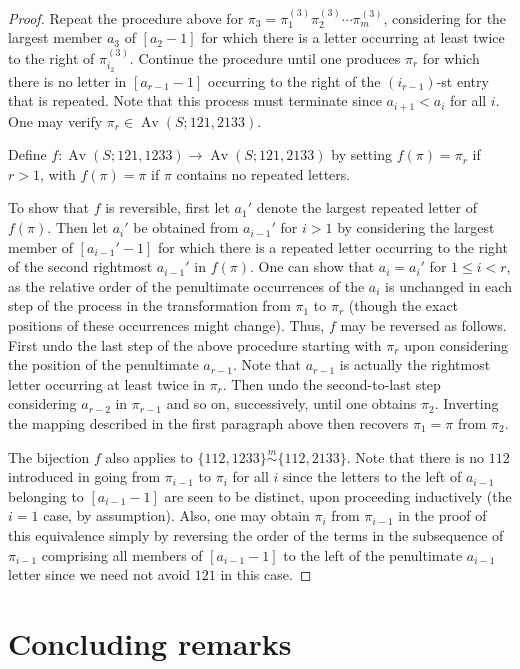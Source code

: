 \documentclass[11pt]{amsart}
\theoremstyle{plain}
\theoremstyle{definition}
\newcommand{\csim}{\stackrel{m}{\sim}}
\DeclareMathOperator{\Av}{Av}
\begin{document}
\begin{proof}
Repeat the procedure above for $\pi_3=\pi_1^{(3)}\pi_2^{(3)}\cdots\pi_m^{(3)}$, considering for the
largest member $a_3$ of $[a_2-1]$ for which there is a letter occurring at least twice to the right
of $\pi_{i_2}^{(3)}$.  Continue the procedure until one produces $\pi_r$ for which there is no letter
in $[a_{r-1}-1]$ occurring to the right of the $(i_{r-1})$-st entry that is repeated.  Note that this
process must terminate since $a_{i+1}<a_i$ for all $i$.  One may verify $\pi_r \in \Av(S;121,2133)$.

Define $f\colon\Av(S;121,1233)\rightarrow \Av(S;121,2133)$ by setting $f(\pi)=\pi_r$ if $r>1$,
with $f(\pi)=\pi$ if $\pi$ contains no repeated letters.

To show that $f$ is reversible, first let $a_1'$ denote the largest repeated letter of $f(\pi)$.
Then let $a_i'$ be obtained from $a_{i-1}'$ for $i>1$ by considering the largest member of
$[a_{i-1}'-1]$ for which there is a repeated letter occurring to the right of the second rightmost
$a_{i-1}'$ in $f(\pi)$.  One can show that $a_i=a_i'$ for $1 \leq i <r$, as the relative order of the
penultimate occurrences of the $a_i$ is unchanged in each step of the process in the transformation
from $\pi_1$ to $\pi_r$ (though the exact positions of these occurrences might change).  Thus, $f$
may be reversed as follows.  First undo the last step of the above procedure starting with $\pi_r$
upon considering the position of the penultimate $a_{r-1}$.  Note that $a_{r-1}$ is actually the
rightmost letter occurring at least twice in $\pi_r$.  Then undo the second-to-last step considering
$a_{r-2}$ in $\pi_{r-1}$ and so on, successively, until one obtains $\pi_2$.  Inverting the mapping
described in the first paragraph above then recovers $\pi_1=\pi$ from $\pi_2$.

The bijection $f$ also applies to $\{112,1233\}\csim\{112,2133\}$.  Note that there is no $112$
introduced in going from $\pi_{i-1}$ to $\pi_i$ for all $i$ since the letters to the left of
$a_{i-1}$ belonging to $[a_{i-1}-1]$ are seen to be distinct, upon proceeding inductively (the $i=1$
case, by assumption).  Also, one may obtain $\pi_i$ from $\pi_{i-1}$ in the proof of this equivalence
simply by reversing the order of the terms in the subsequence of $\pi_{i-1}$ comprising all members
of $[a_{i-1}-1]$ to the left of the penultimate $a_{i-1}$ letter since we need not avoid $121$ in
this case.
\end{proof}

\section{Concluding remarks}
\end{document}
